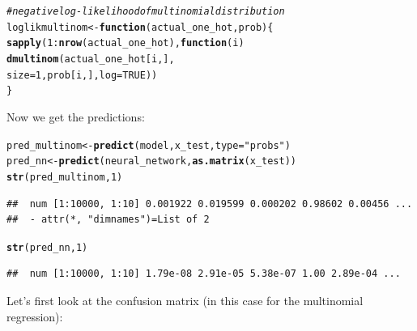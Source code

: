 \documentclass[a4paper]{article}
\makeatletter
\newcommand{\hlnum}[1]{\textcolor[rgb]{0.686,0.059,0.569}{#1}}%
\newcommand{\hlstr}[1]{\textcolor[rgb]{0.192,0.494,0.8}{#1}}%
\newcommand{\hlcom}[1]{\textcolor[rgb]{0.678,0.584,0.686}{\textit{#1}}}%
\newcommand{\hlopt}[1]{\textcolor[rgb]{0,0,0}{#1}}%
\newcommand{\hlstd}[1]{\textcolor[rgb]{0.345,0.345,0.345}{#1}}%
\newcommand{\hlkwa}[1]{\textcolor[rgb]{0.161,0.373,0.58}{\textbf{#1}}}%
\newcommand{\hlkwb}[1]{\textcolor[rgb]{0.69,0.353,0.396}{#1}}%
\newcommand{\hlkwc}[1]{\textcolor[rgb]{0.333,0.667,0.333}{#1}}%
\newcommand{\hlkwd}[1]{\textcolor[rgb]{0.737,0.353,0.396}{\textbf{#1}}}%
\newenvironment{kframe}{%
 \def\at@end@of@kframe{}%
 \ifinner\ifhmode%
  \def\at@end@of@kframe{\end{minipage}}%
  \begin{minipage}{\columnwidth}%
 \fi\fi%
 \def\FrameCommand##1{\hskip\@totalleftmargin \hskip-\fboxsep
 \colorbox{shadecolor}{##1}\hskip-\fboxsep
     \hskip-\linewidth \hskip-\@totalleftmargin \hskip\columnwidth}%
 \MakeFramed {\advance\hsize-\width
   \@totalleftmargin\z@ \linewidth\hsize
   \@setminipage}}%
 {\par\unskip\endMakeFramed%
 \at@end@of@kframe}
\newenvironment{knitrout}{}{} %
\makeatother
\begin{document}
{\begin{enumerate}
\begin{knitrout}
\begin{kframe}
\begin{alltt}
\hlcom{# negative log-likelihood of multinomial distribution}
\hlstd{loglikmultinom} \hlkwb{<-} \hlkwa{function}\hlstd{(}\hlkwc{actual_one_hot}\hlstd{,} \hlkwc{prob}\hlstd{) \{}
  \hlkwd{sapply}\hlstd{(}\hlnum{1}\hlopt{:}\hlkwd{nrow}\hlstd{(actual_one_hot),} \hlkwa{function}\hlstd{(}\hlkwc{i}\hlstd{)}
    \hlkwd{dmultinom}\hlstd{(actual_one_hot[i,],}
              \hlkwc{size} \hlstd{=} \hlnum{1}\hlstd{, prob[i,],} \hlkwc{log} \hlstd{=} \hlnum{TRUE}\hlstd{))}
\hlstd{\}}
\end{alltt}
\end{kframe}
\end{knitrout}

Now we get the predictions:

\begin{knitrout}
\color{fgcolor}\begin{kframe}
\begin{alltt}
\hlstd{pred_multinom} \hlkwb{<-} \hlkwd{predict}\hlstd{(model, x_test,} \hlkwc{type} \hlstd{=} \hlstr{"probs"}\hlstd{)}
\hlstd{pred_nn} \hlkwb{<-} \hlkwd{predict}\hlstd{(neural_network,} \hlkwd{as.matrix}\hlstd{(x_test))}
\hlkwd{str}\hlstd{(pred_multinom,} \hlnum{1}\hlstd{)}
\end{alltt}
\begin{verbatim}
##  num [1:10000, 1:10] 0.001922 0.019599 0.000202 0.98602 0.00456 ...
##  - attr(*, "dimnames")=List of 2
\end{verbatim}
\begin{alltt}
\hlkwd{str}\hlstd{(pred_nn,} \hlnum{1}\hlstd{)}
\end{alltt}
\begin{verbatim}
##  num [1:10000, 1:10] 1.79e-08 2.91e-05 5.38e-07 1.00 2.89e-04 ...
\end{verbatim}
\end{kframe}
\end{knitrout}

Let's first look at the confusion matrix (in this case for the multinomial regression):


\end{enumerate}}
\end{document}
